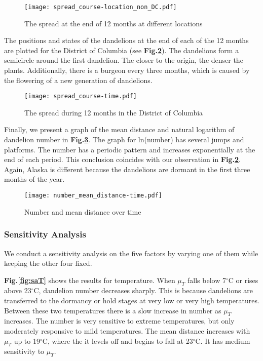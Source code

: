 \documentclass[12pt]{article}
\begin{document}
			\begin{figure}[htbp]
				\centering
				\texttt{[image: spread\_course-location\_non\_DC.pdf]}
				\caption{The spread at the end of 12 months at different locations}
				\label{fig:scatter5loc}
			\end{figure}
			
			The positions and states of the dandelions at the end of each of the 12 months are plotted for the District of Columbia (see \textbf{Fig.\ref{fig:spreadDC}}).  The dandelions form a semicircle around the first dandelion.  The closer to the origin, the denser the plants.  Additionally, there is a burgeon every three months, which is caused by the flowering of a new generation of dandelions.
			
			\begin{figure}[htbp]
				\centering
				\texttt{[image: spread\_course-time.pdf]}
				\caption{The spread during 12 months in the District of Columbia}
				\label{fig:spreadDC}
			\end{figure}
			
			Finally, we present a graph of the mean distance and natural logarithm of dandelion number in \textbf{Fig.\ref{fig:time}}.  The graph for ln(number) has several jumps and platforms.  The number has a periodic pattern and increases exponentially at the end of each period.  This conclusion coincides with our observation in \textbf{Fig.\ref{fig:spreadDC}}.  Again, Alaska is different because the dandelions are dormant in the first three months of the year.  
			
			\begin{figure}[htbp]
				\centering
				\texttt{[image: number\_mean\_distance-time.pdf]}
				\caption{Number and mean distance over time}
				\label{fig:time}
			\end{figure}
		
		
		
		\subsubsection{Sensitivity Analysis}
			
			We conduct a sensitivity analysis on the five factors by varying one of them while keeping the other four fixed.  
			
			\textbf{Fig.\ref{fig:saT}} shows the results for temperature.  When $\mu_T$ falls below 7$^\circ$C or rises above 23$^\circ$C, dandelion number decreases sharply.  This is because dandelions are transferred to the dormancy or hold stages at very low or very high temperatures.  Between these two temperatures there is a slow increase in number as $\mu_T$ increases.  The number is very sensitive to extreme temperatures, but only moderately responsive to mild temperatures.  The mean distance increases with $\mu_T$ up to 19$^\circ$C, where the it levels off and begins to fall at 23$^\circ$C.  It has medium sensitivity to $\mu_T$.
			
\end{document}
